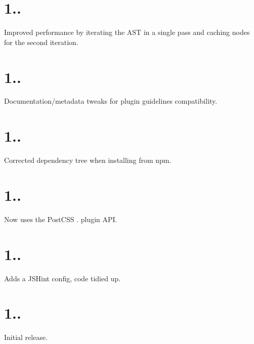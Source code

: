 \section*{1..}


\begin{DoxyItemize}
\item Improved performance by iterating the A\+ST in a single pass and caching nodes for the second iteration.
\end{DoxyItemize}

\section*{1..}


\begin{DoxyItemize}
\item Documentation/metadata tweaks for plugin guidelines compatibility.
\end{DoxyItemize}

\section*{1..}


\begin{DoxyItemize}
\item Corrected dependency tree when installing from npm.
\end{DoxyItemize}

\section*{1..}


\begin{DoxyItemize}
\item Now uses the Post\+C\+SS {.} plugin A\+PI.
\end{DoxyItemize}

\section*{1..}


\begin{DoxyItemize}
\item Adds a J\+S\+Hint config, code tidied up.
\end{DoxyItemize}

\section*{1..}


\begin{DoxyItemize}
\item Initial release. 
\end{DoxyItemize}